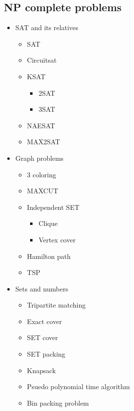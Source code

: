 \documentclass[11pt]{article}
\begin{document}
\subsection{NP complete problems}
\label{sec:orgbf260cc}
\begin{itemize}
\item SAT and its relatives
\begin{itemize}
\item SAT
\item Circuitsat
\item KSAT
\begin{itemize}
\item 2SAT
\item 3SAT
\end{itemize}
\item NAESAT
\item MAX2SAT
\end{itemize}

\item Graph problems
\begin{itemize}
\item 3 coloring
\item MAXCUT
\item Independent SET
\begin{itemize}
\item Clique
\item Vertex cover
\end{itemize}
\item Hamilton path
\item TSP
\end{itemize}

\item Sets and numbers
\begin{itemize}
\item Tripartite matching
\item Exact cover
\item SET cover
\item SET packing
\item Knapsack
\item Psuedo polynomial time algorithm
\item Bin packing problem
\end{itemize}
\end{itemize}
\end{document}
